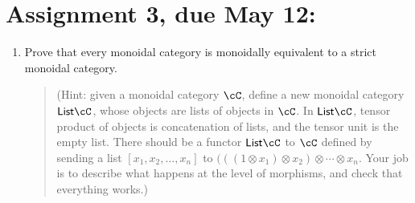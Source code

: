 \documentclass[12pt]{amsart}
\begin{document}
\section{Assignment 3, due May 12:}
\begin{enumerate}
\item Prove that every monoidal category is monoidally equivalent to a strict monoidal category.

\begin{quote}
(Hint: given a monoidal category $\cC$, define a new monoidal category $\mathsf{List} \cC$, whose objects are lists of objects in $\cC$. In $\mathsf{List} \cC$, tensor product of objects is concatenation of lists, and the tensor unit is the empty list. There should be a functor $\mathsf{List} \cC$ to $\cC$ defined by sending a list $[x_1, x_2, \ldots, x_n]$ to $(((1 \otimes x_1) \otimes x_2) \otimes \cdots \otimes x_n$. Your job is to describe what happens at the level of morphisms, and check that everything works.)
\end{quote}




\end{enumerate}
\end{document}
